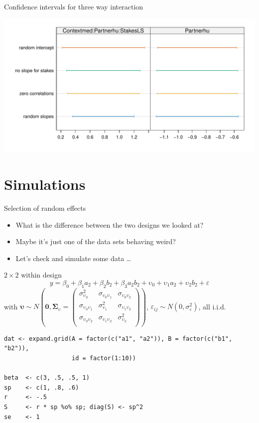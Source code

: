 \documentclass[aspectratio=169]{beamer}
\newcommand{\gvect}[1]{\boldsymbol{#1}}
\newcommand{\gmat}[1]{\boldsymbol{#1}}
\begin{document}
\begin{frame}{Confidence intervals for three way interaction}
  \begin{center}
    \includegraphics[scale=.7]{../figures/nico_cis_data-risk}
  \end{center}
\end{frame}

\section{Simulations}

\begin{frame}[<+->]{Selection of random effects}
  \begin{itemize}
    \item What is the difference between the two designs we looked at?
    \item Maybe it's just one of the data sets behaving weird?
    \item Let's check and simulate some data \dots
  \end{itemize}
\end{frame}

\begin{frame}[fragile]{$2\times 2$ within design}
  \[
    y = \beta_0 + \beta_1 a_2 + \beta_2 b_2 + \beta_3 a_2b_2 +
        \upsilon_0 + \upsilon_1 a_2 + \upsilon_2 b_2 + \varepsilon
  \]
  with $\gvect{\upsilon} \sim N\left(\gvect{0}, \gmat{\Sigma}_{\upsilon} = 
    \begin{pmatrix}
      \sigma^2_{\upsilon_0} & \sigma_{\upsilon_0\upsilon_1}  & \sigma_{\upsilon_0\upsilon_2}\\
      \sigma_{\upsilon_0\upsilon_1} & \sigma^2_{\upsilon_1}  & \sigma_{\upsilon_1\upsilon_2}\\
      \sigma_{\upsilon_0\upsilon_2} & \sigma_{\upsilon_1\upsilon_2} & \sigma^2_{\upsilon_2} \\
    \end{pmatrix}\right)$, $\varepsilon_{ij} \sim N(0, \sigma_{\varepsilon}^2)$,
    all i.i.d.
    \vspace{.5cm}
  \small
  \begin{lstlisting}
dat <- expand.grid(A = factor(c("a1", "a2")), B = factor(c("b1", "b2")),
                   id = factor(1:10))

beta  <- c(3, .5, .5, 1)
sp    <- c(1, .8, .6)
r     <- -.5
S     <- r * sp %o% sp; diag(S) <- sp^2
se    <- 1
  \end{lstlisting}
\end{frame}
\end{document}
